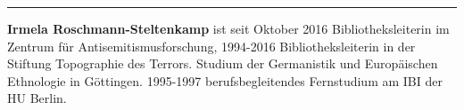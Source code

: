\begin{center}\rule{0.5\linewidth}{\linethickness}\end{center}

\textbf{Irmela Roschmann-Steltenkamp} ist seit Oktober 2016
Bibliotheksleiterin im Zentrum für Antisemitismusforschung, 1994-2016
Bibliotheksleiterin in der Stiftung Topographie des Terrors. Studium der
Germanistik und Europäischen Ethnologie in Göttingen. 1995-1997
berufsbegleitendes Fernstudium am IBI der HU Berlin.

